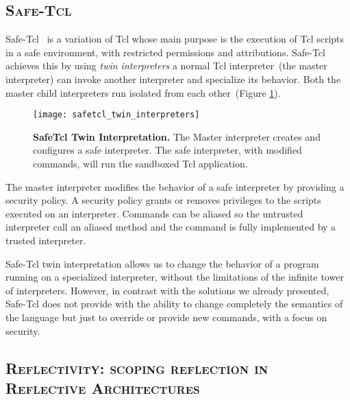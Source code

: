 \subsection*{\textsc{Safe-Tcl}}
Safe-Tcl~\cite{Levy97a, Bore94a} is a variation of Tcl whose main purpose is the execution of Tcl scripts in a safe environment, with restricted permissions and attributions. Safe-Tcl achieves this by using \emph{twin interpreters} \ie a normal Tcl interpreter~(the master interpreter) can invoke another interpreter and specialize its behavior. Both the master child interpreters run isolated from each other~(Figure \ref{fig:safetcl_twin_interpreters}).

\begin{figure}[ht]
\begin{center}
\texttt{[image: safetcl\_twin\_interpreters]}
\caption{\textbf{SafeTcl Twin Interpretation.} The Master interpreter creates and configures a safe interpreter. The safe interpreter, with modified commands, will run the sandboxed Tcl application.\label{fig:safetcl_twin_interpreters}
 }
\end{center}
\end{figure}

The master interpreter modifies the behavior of a safe interpreter by providing a security policy. A security policy grants or removes privileges to the scripts executed on an interpreter. Commands can be aliased so the untrusted interpreter call an aliased method and the command is fully implemented by a trusted interpreter.

Safe-Tcl twin interpretation allows us to change the behavior of a program running on a specialized interpreter, without the limitations of the infinite tower of interpreters. However, in contrast with the solutions we already presented, Safe-Tcl does not provide with the ability to change completely the semantics of the language but just to override or provide new commands, with a focus on security.

\subsection*{\textsc{Reflectivity: scoping reflection in Reflective Architectures}}

